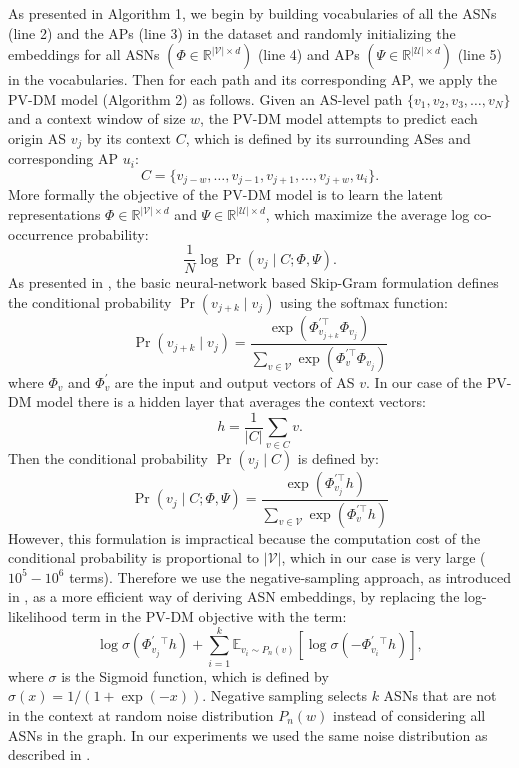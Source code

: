 \documentclass[10pt,journal]{IEEEtran}
\begin{document}
As presented in Algorithm 1, we begin by building vocabularies of all the ASNs (line 2) and the APs (line 3) in the dataset and randomly initializing the embeddings for all ASNs $(\Phi \in \mathbb{R}^{|\mathcal{V}|\times d})$ (line 4) and APs $(\Psi \in \mathbb{R}^{|\mathcal{U}|\times d})$ (line 5) in the vocabularies. Then for each path and its corresponding AP, we apply the PV-DM model (Algorithm 2) as follows. Given an AS-level path $\{v_{1},v_{2},v_{3},\ldots,v_{N}\}$ and a context window of size $w$, the PV-DM model attempts to predict each origin AS $v_{j}$ by its context $C$, which is defined by its surrounding ASes and corresponding AP $u_{i}$:
\begin{equation}
C = \{v_{j-w},\ldots, v_{j-1}, v_{j+1},\ldots, v_{j+w}, u_i\}.
\end{equation}
More formally the objective of the PV-DM model is to learn the latent representations $\Phi \in \mathbb{R}^{|\mathcal{V}|\times d}$ and $\Psi \in \mathbb{R}^{|\mathcal{U}|\times d}$, which maximize the average log co-occurrence probability:
\begin{equation}
\frac{1}{N}\log \Pr(v_j \mid C;\Phi,\Psi).
\end{equation}
As presented in \cite{mikolov2013distributed}, the basic neural-network based Skip-Gram formulation defines the conditional probability $\Pr(v_{j+k}\mid v_{j})$ using the softmax function:
\begin{equation}
\Pr(v_{j+k}\mid v_j) = \frac{\exp(\Phi_{v_{j+k}}^{\prime\top}\Phi_{v_j})}{\sum_{v\in\mathcal{V}}\exp(\Phi_v^{\prime\top}\Phi_{v_j})}
\end{equation}
where $\Phi_v$ and $\Phi_v^{\prime}$ are the input and output vectors of AS $v$. In our case of the PV-DM model there is a hidden layer that averages the context vectors:
\begin{equation}
h = \frac{1}{|C|}\sum_{v\in C}v.
\end{equation}
Then the conditional probability $\Pr(v_{j}\mid C)$ is defined by:
\begin{equation}
\Pr(v_{j}\mid C;\Phi,\Psi) = \frac{\exp(\Phi_{v_{j}}^{\prime\top}h)}{\sum_{v\in\mathcal{V}}\exp(\Phi_{v}^{\prime\top}h)}
\end{equation}
However, this formulation is impractical because the computation cost of the conditional probability is proportional to $|\mathcal{V}|$, which in our case is very large ($10^{5}-10^{6}$ terms). Therefore we use the negative-sampling approach, as introduced in \cite{mikolov2013distributed}, as a more efficient way of deriving ASN embeddings, by replacing the log-likelihood term in the PV-DM objective with the term:
\begin{equation}
\log\sigma(\Phi^{\prime}_{v_{j}}{}^{\top}h) + \sum_{i=1}^{k}\mathbb{E}_{v_{i}\sim P_{n}(v)}[\log\sigma(-\Phi^{\prime}_{v_{i}}{}^{\top}h)],
\end{equation}
where $\sigma$ is the Sigmoid function, which is defined by $\sigma(x) = 1/(1+\exp(-x))$. Negative sampling selects $k$ ASNs that are not in the context at random noise distribution $P_{n}(w)$ instead of considering all ASNs in the graph. In our experiments we used the same noise distribution as described in \cite{mikolov2013distributed}.
\end{document}
